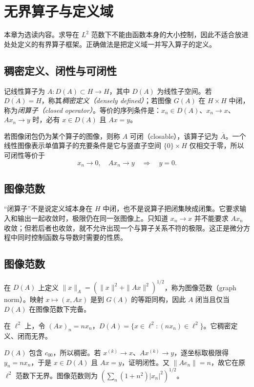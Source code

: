 \setcounter{chapter}{14} %
\chapter{无界算子与定义域}
\label{chap:fa-unbounded}

本章为选读内容。求导在 $L^2$ 范数下不能由函数本身的大小控制，因此不适合放进处处定义的有界算子框架。正确做法是把定义域一并写入算子的定义。

\section{稠密定义、闭性与可闭性}
记线性算子为 $A:D(A)\subset H\to H$，其中 $D(A)$ 为线性子空间。若 $\overline{D(A)}=H$，称其\emph{稠密定义（densely defined）}；若图像 $G(A)$ 在 $H\times H$ 中闭，称为\emph{闭算子（closed operator）}。等价的序列条件是：$x_n\in D(A)$、$x_n\to x$、$Ax_n\to y$ 时，必有 $x\in D(A)$ 且 $Ax=y$。

若图像闭包仍为某个算子的图像，则称 $A$ 可闭（closable），该算子记为 $\overline A$。一个线性图像表示单值算子的充要条件是它与竖直子空间 $\{0\}\times H$ 仅相交于零，所以可闭性等价于
\[
 x_n\to0,\quad Ax_n\to y\quad\Longrightarrow\quad y=0.
\]

\section{图像范数}
“闭算子”不是说定义域本身在 $H$ 中闭，也不是说算子把闭集映成闭集。它要求输入和输出一起收敛时，极限仍在同一张图像上。只知道 $x_n\to x$ 并不能要求 $Ax_n$ 收敛；但若后者也收敛，就不允许出现一个与算子关系不符的极限。这正是微分方程中同时控制函数与导数时需要的性质。

\section{图像范数}
在 $D(A)$ 上定义 $\|x\|_A=(\|x\|^2+\|Ax\|^2)^{1/2}$，称为图像范数（graph norm）。映射 $x\mapsto(x,Ax)$ 是到 $G(A)$ 的等距同构，因此 $A$ 闭当且仅当 $D(A)$ 在图像范数下完备。

\begin{example}\label{ex:fa-unbounded-diagonal}
在 $\ell^2$ 上，令 $(Ax)_n=nx_n$，$D(A)=\{x\in\ell^2:(nx_n)\in\ell^2\}$。它稠密定义、闭而无界。
\end{example}
\begin{solve}
$D(A)$ 包含 $c_{00}$，所以稠密。若 $x^{(k)}\to x$、$Ax^{(k)}\to y$，逐坐标取极限得 $y_n=nx_n$，于是 $x\in D(A)$ 且 $Ax=y$，证明闭性。又 $\|Ae_n\|=n$，故它在原 $\ell^2$ 范数下无界。图像范数则为 $(\sum_n(1+n^2)|x_n|^2)^{1/2}$。
\end{solve}

